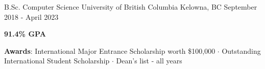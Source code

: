 

\begin{cventries}


	\cventry
	{B.Sc. Computer Science} %
	{University of British Columbia} %
	{Kelowna, BC} %
	{September 2018 - April 2023} %
	{
		\begin{cvitems} %
			\item {\textbf{91.4\% GPA}}
			\item {\textbf{Awards}: International Major Entrance Scholarship worth \$100,000 $\cdot$ Outstanding International Student Scholarship $\cdot$ Dean's list - all years}
		\end{cvitems}
	}

\end{cventries}



